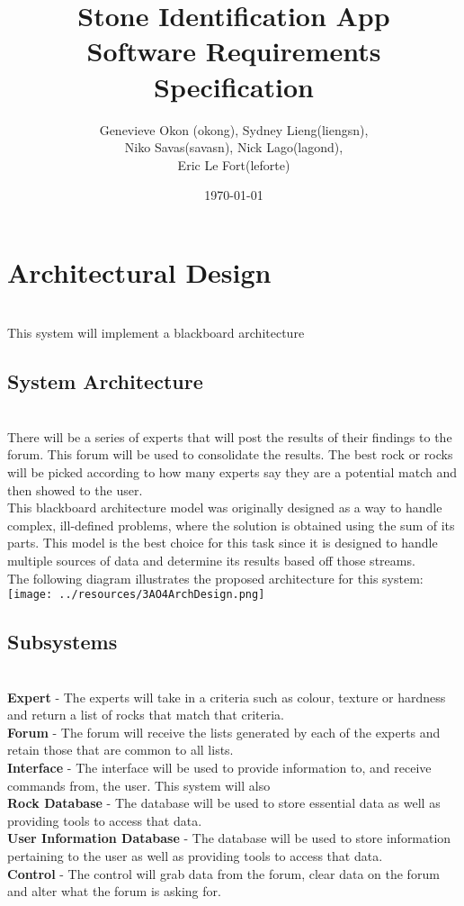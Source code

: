 \documentclass[titlepage]{article}
\title{Stone Identification App \\
	Software Requirements Specification}
\author{Genevieve Okon (okong), Sydney Lieng(liengsn),\\
	Niko Savas(savasn), Nick Lago(lagond),\\
	Eric Le Fort(leforte)}
\date{\today}
\begin{document}
\maketitle
\newpage

\section{Architectural Design}~\\
This system will implement a blackboard architecture 
\subsection{System Architecture}~\\

There will be a series of experts that will post the results of their findings to the forum. This forum will be used to consolidate the results. The best rock or rocks will be picked according to how many experts say they are a potential match and then showed to the user.\\

This blackboard architecture model was originally designed as a way to handle complex, ill-defined problems, where the solution is obtained using the sum of its parts. This model is the best choice for this task since it is designed to handle multiple sources of data and determine its results based off those streams.\\

The following diagram illustrates the proposed architecture for this system:\\

\texttt{[image: ../resources/3AO4ArchDesign.png]}

\subsection{Subsystems}~\\

\textbf{Expert} - The experts will take in a criteria such as colour, texture or hardness and return a list of rocks that match that criteria.\\

\textbf{Forum} - The forum will receive the lists generated by each of the experts and retain those that are common to all lists.\\

\textbf{Interface} - The interface will be used to provide information to, and receive commands from, the user. This system will also \\

\textbf{Rock Database} - The database will be used to store essential data as well as providing tools to access that data.\\

\textbf{User Information Database} - The database will be used to store information pertaining to the user as well as providing tools to access that data.\\

\textbf{Control} - The control will grab data from the forum, clear data on the forum and alter what the forum is asking for.
\end{document}
